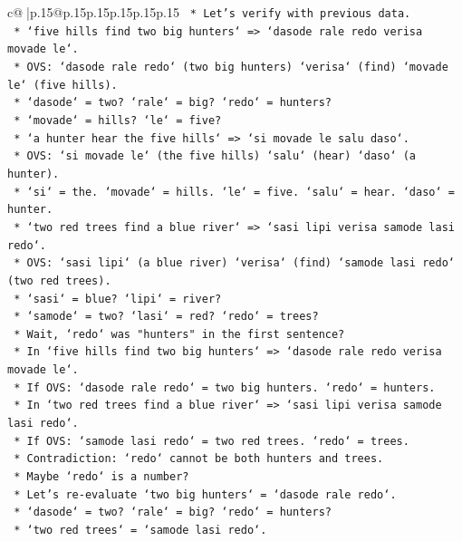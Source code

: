 \documentclass{article}
\begin{document}
{\begin{supertabular}{c@{$\;$}|p{.15\linewidth}@{}p{.15\linewidth}p{.15\linewidth}p{.15\linewidth}p{.15\linewidth}p{.15\linewidth}}
{{{\texttt{        *   Let's verify with previous data.} \\
\texttt{        *   `five hills find two big hunters` => `dasode rale redo verisa movade le`.} \\
\texttt{        *   OVS: `dasode rale redo` (two big hunters) `verisa` (find) `movade le` (five hills).} \\
\texttt{        *   `dasode` = two? `rale` = big? `redo` = hunters?} \\
\texttt{        *   `movade` = hills? `le` = five?} \\
\texttt{        *   `a hunter hear the five hills` => `si movade le salu daso`.} \\
\texttt{        *   OVS: `si movade le` (the five hills) `salu` (hear) `daso` (a hunter).} \\
\texttt{        *   `si` = the. `movade` = hills. `le` = five. `salu` = hear. `daso` = hunter.} \\
\texttt{        *   `two red trees find a blue river` => `sasi lipi verisa samode lasi redo`.} \\
\texttt{        *   OVS: `sasi lipi` (a blue river) `verisa` (find) `samode lasi redo` (two red trees).} \\
\texttt{        *   `sasi` = blue? `lipi` = river?} \\
\texttt{        *   `samode` = two? `lasi` = red? `redo` = trees?} \\
\texttt{        *   Wait, `redo` was "hunters" in the first sentence?} \\
\texttt{        *   In `five hills find two big hunters` => `dasode rale redo verisa movade le`.} \\
\texttt{        *   If OVS: `dasode rale redo` = two big hunters. `redo` = hunters.} \\
\texttt{        *   In `two red trees find a blue river` => `sasi lipi verisa samode lasi redo`.} \\
\texttt{        *   If OVS: `samode lasi redo` = two red trees. `redo` = trees.} \\
\texttt{        *   Contradiction: `redo` cannot be both hunters and trees.} \\
\texttt{        *   Maybe `redo` is a number?} \\
\texttt{        *   Let's re{-}evaluate `two big hunters` = `dasode rale redo`.} \\
\texttt{        *   `dasode` = two? `rale` = big? `redo` = hunters?} \\
\texttt{        *   `two red trees` = `samode lasi redo`.} \\
}}}
\end{supertabular}}
\end{document}
